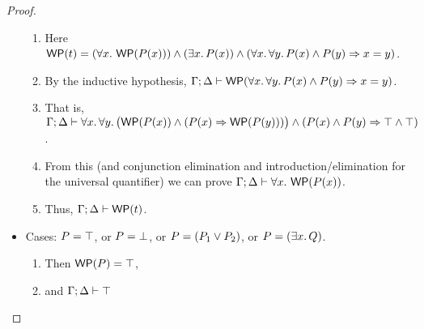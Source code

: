 \documentclass[10pt,a4paper]{article}
\begin{document}
\begin{proof}
\begin{itemize}
    \begin{enumerate}
      \item 
        Here
        $\mathop{\mathsf{WP}}(t) = 
        (\forall x.\, \mathop{\mathsf{WP}}(P(x))) \wedge (\exists x.\, P(x)) \wedge (\forall x.\, \forall y.\, P(x) \wedge P(y) \Rightarrow x=y)$.
      \item 
        By the inductive hypothesis, 
        $\Gamma;\Delta \vdash \mathop{\mathsf{WP}}(\forall x.\, \forall y.\, P(x) \wedge P(y) \Rightarrow x=y)$.
      \item
      	That is, 
	$\Gamma;\Delta \vdash \forall x.\, \forall y.\, \bigl(\mathop{\mathsf{WP}}(P(x)) \wedge (P(x) \Rightarrow \mathop{\mathsf{WP}}(P(y)))\bigr) \wedge (P(x) \wedge P(y) \Rightarrow \top \wedge \top)$.
	  \item
	    From this (and conjunction elimination and introduction/elimination
	    for the universal quantifier) we can prove 
	      $\Gamma;\Delta \vdash \forall x.\, \mathop{\mathsf{WP}}(P(x))$.
      \item 
        Thus, $\Gamma;\Delta \vdash \mathop{\mathsf{WP}}(t)$.
      \end{enumerate}
      
  \item Cases: $P = \top$, or $P = \bot$, or $P = (P_1 \vee P_2)$, or $P = (\exists x.\, Q)$.
      \begin{enumerate}
      \item 
      	Then $\mathop{\mathsf{WP}}(P) = \top$,
      \item
        and $\Gamma;\Delta \vdash \top$ 
      \end{enumerate}
            

\end{itemize}
\end{proof}
\end{document}
